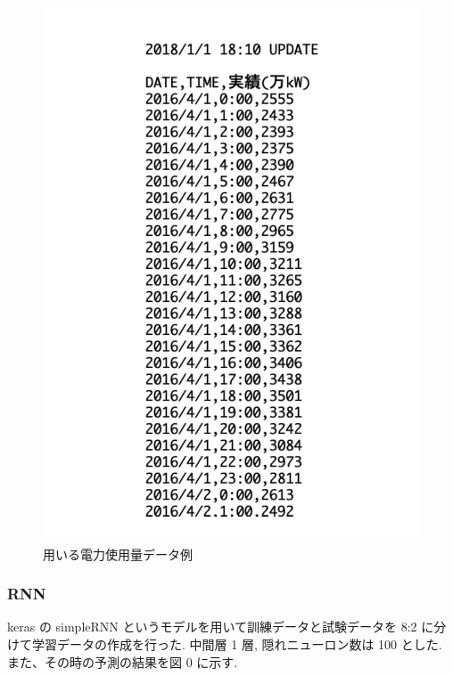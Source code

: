 \begin{figure}[hb]
\centering
\includegraphics[scale=0.5]{exe_csv.pdf}
 \caption{用いる電力使用量データ例}
\end{figure}

\subsubsection{RNN}
keras の simpleRNN というモデルを用いて訓練データと試験データを 8:2 に分けて学習データの作成を行った. 中間層 1 層, 隠れニューロン数は 100 とした. また、その時の予測の結果を図 0 に示す.

